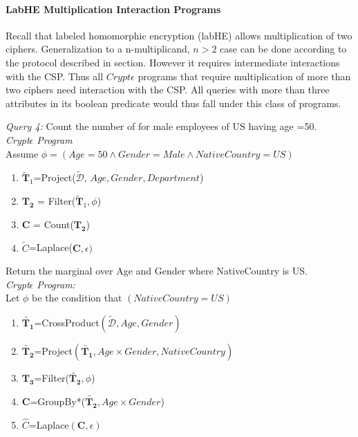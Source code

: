 \paragraph{\textbf{LabHE Multiplication Interaction Programs}}
Recall that labeled homomorphic encryption (labHE) allows multiplication of two ciphers. Generalization to a n-multiplicand, $n > 2$ case can be done according to the protocol described in section. However it requires intermediate interactions with the CSP. Thus all $Crypt\epsilon$ programs that require multiplication of more than two ciphers need interaction with the CSP. 
All queries with more than three attributes in its boolean predicate would thus fall under this class of programs.
\begin{exmp}\textit{Query 4:} Count the number of for male employees of US having age =50. \\\textit{Crypt$\epsilon$ Program} \\Assume $\phi=(Age=50 \wedge Gender=Male \wedge NativeCountry=US)$ \end{exmp} \begin{enumerate} \item $\mathbf{\tilde{T}}_1$=Project($\boldsymbol{\tilde{\mathcal{D}}}$, $Age,Gender,Department$)  \item  $\mathbf{T_2}$ = Filter($\mathbf{\tilde{T}}_1,\phi$)\item $\mathbf{C}$ = Count($\mathbf{T_2}$) \item $\tilde{C}$=Laplace($\mathbf{C},\epsilon)$\end{enumerate}
\begin{exmp}Return the marginal over Age and Gender where NativeCountry is US. \\\textit{Crypt$\epsilon$ Program:}\\ Let $\phi$ be the condition that $(NativeCountry=US) $  \begin{enumerate}\item $\tilde{\mathbf{T_1}}$=CrossProduct$(\boldsymbol{\tilde{\mathcal{D}}},Age,Gender)$ \item $\tilde{\mathbf{T_2}}$=Project$(\tilde{\mathbf{T_1}}, Age \times Gender, NativeCountry)$ \item $\mathbf{T_3}$=Filter($\tilde{\mathbf{T_2}},\phi$)\item $\mathbf{C}$=GroupBy*($\tilde{\mathbf{T_2}},Age\times Gender$)\item $\hat{C}$=Laplace$(\mathbf{C},\epsilon)$ \end{enumerate}\end{exmp}
